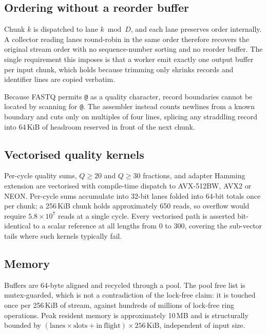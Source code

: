 \subsection{Ordering without a reorder buffer}

Chunk $k$ is dispatched to lane $k \bmod D$, and each lane preserves order
internally. A collector reading lanes round-robin in the same order therefore
recovers the original stream order with no sequence-number sorting and no
reorder buffer. The single requirement this imposes is that a worker emit
exactly one output buffer per input chunk, which holds because trimming only
shrinks records and identifier lines are copied verbatim.

Because FASTQ permits \texttt{@} as a quality character, record boundaries
cannot be located by scanning for \texttt{@}. The assembler instead counts
newlines from a known boundary and cuts only on multiples of four lines,
splicing any straddling record into 64\,KiB of headroom reserved in front of
the next chunk.

\subsection{Vectorised quality kernels}

Per-cycle quality sums, $Q\!\ge\!20$ and $Q\!\ge\!30$ fractions, and adapter
Hamming extension are vectorised with compile-time dispatch to AVX-512BW, AVX2
or NEON. Per-cycle sums accumulate into 32-bit lanes folded into 64-bit totals
once per chunk; a 256\,KiB chunk holds approximately 650 reads, so overflow
would require $5.8\times10^{7}$ reads at a single cycle. Every vectorised path
is asserted bit-identical to a scalar reference at all lengths from 0 to 300,
covering the sub-vector tails where such kernels typically fail.

\subsection{Memory}

Buffers are 64-byte aligned and recycled through a pool. The pool free list is
mutex-guarded, which is not a contradiction of the lock-free claim: it is
touched once per 256\,KiB of stream, against hundreds of millions of lock-free
ring operations. Peak resident memory is approximately 10\,MB and is
structurally bounded by
$(\mathrm{lanes}\times\mathrm{slots}+\mathrm{in\ flight})\times 256\,\mathrm{KiB}$,
independent of input size.

